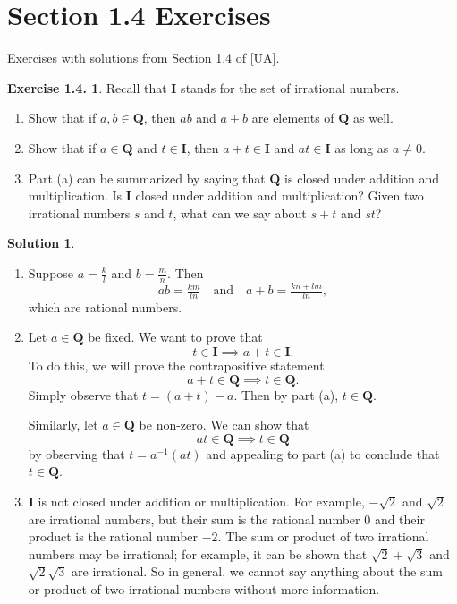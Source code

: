 \documentclass[12pt]{article}
\theoremstyle{definition}
\theoremstyle{exercise}
\newtheorem{exercise}{Exercise 1.4.}
\theoremstyle{solution}
\newtheorem*{solution}{Solution}
\newcommand{\Q}{\mathbf{Q}}
\begin{document}
\section{Section 1.4 Exercises}

Exercises with solutions from Section 1.4 of \hyperlink{ua}{[UA]}.

\begin{exercise}
\label{ex:1}
    Recall that \( \mathbf{I} \) stands for the set of irrational numbers.
    \begin{enumerate}
        \item Show that if \( a, b \in \Q \), then \( ab \) and \( a + b \) are elements of \( \Q \) as well.

        \item Show that if \( a \in \Q \) and \( t \in \mathbf{I} \), then \( a + t \in \mathbf{I} \) and \( at \in \mathbf{I} \) as long as \( a \neq 0 \).

        \item Part (a) can be summarized by saying that \( \Q \) is closed under addition and multiplication. Is \( \mathbf{I} \) closed under addition and multiplication? Given two irrational numbers \( s \) and \( t \), what can we say about \( s + t \) and \( st \)?
    \end{enumerate}
\end{exercise}

\begin{solution}
    \begin{enumerate}
        \item Suppose \( a = \tfrac{k}{l} \) and \( b = \tfrac{m}{n} \). Then
        \[
            ab = \tfrac{km}{ln} \quad \text{and} \quad a + b = \tfrac{kn + lm}{ln},
        \]
        which are rational numbers.

        \item Let \( a \in \Q \) be fixed. We want to prove that
        \[
            t \in \mathbf{I} \implies a + t \in \mathbf{I}.
        \]
        To do this, we will prove the contrapositive statement
        \[
            a + t \in \Q \implies t \in \Q.
        \]
        Simply observe that \( t = (a + t) - a \). Then by part (a), \( t \in \Q \).

        Similarly, let \( a \in \Q \) be non-zero. We can show that
        \[
            at \in \Q \implies t \in \Q
        \]
        by observing that \( t = a^{-1}(at) \) and appealing to part (a) to conclude that \( t \in \Q \).

        \item \( \mathbf{I} \) is not closed under addition or multiplication. For example, \( -\sqrt{2} \) and \( \sqrt{2} \) are irrational numbers, but their sum is the rational number 0 and their product is the rational number \( -2 \). The sum or product of two irrational numbers may be irrational; for example, it can be shown that \( \sqrt{2} + \sqrt{3} \) and \( \sqrt{2} \sqrt{3} \) are irrational. So in general, we cannot say anything about the sum or product of two irrational numbers without more information.
    \end{enumerate}
\end{solution}
\end{document}
